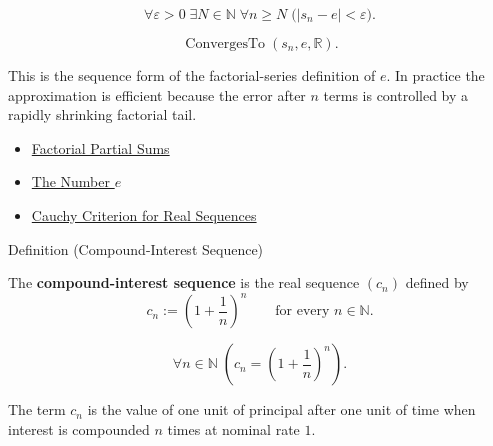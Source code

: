 \begin{remark*}
\[
\forall \varepsilon>0\;\exists N\in\mathbb{N}\;\forall n\ge N
\;\bigl(|s_n-e|<\varepsilon\bigr).
\]
\end{remark*}

\begin{remark*}
\[
\operatorname{ConvergesTo}(s_n,e,\mathbb{R}).
\]
\end{remark*}

\begin{remark*}[Interpretation]
This is the sequence form of the factorial-series definition of $e$. In
practice the approximation is efficient because the error after $n$ terms is
controlled by a rapidly shrinking factorial tail.
\end{remark*}

\begin{dependencies}
\begin{itemize}
  \item \hyperref[def:factorial-partial-sums]{Factorial Partial Sums}
  \item \hyperref[def:number-e]{The Number $e$}
  \item \hyperref[thm:cauchy-criterion-real-sequences]{Cauchy Criterion for Real Sequences}
\end{itemize}
\end{dependencies}


\begin{definitionbox}{Definition (Compound-Interest Sequence)}
\begin{definition}
\label{def:compound-interest-sequence}
The \textbf{compound-interest sequence} is the real sequence $(c_n)$
defined by
\[
  c_n:=\left(1+\frac{1}{n}\right)^n
  \qquad\text{for every } n\in\mathbb{N}.
\]
\end{definition}
\end{definitionbox}

\begin{remark*}
\[
\forall n\in\mathbb{N}\;
\left(
  c_n=\left(1+\frac{1}{n}\right)^n
\right).
\]
\end{remark*}

\begin{remark*}[Interpretation]
The term $c_n$ is the value of one unit of principal after one unit of time
when interest is compounded $n$ times at nominal rate $1$.
\end{remark*}

